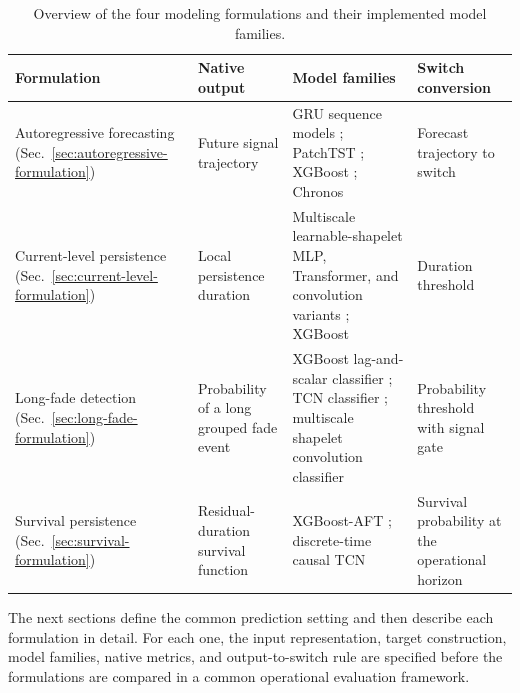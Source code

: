 \begin{table}[htbp]
  \centering
  \small
  \caption{Overview of the four modeling formulations and their implemented
  model families.}
  \label{tab:modeling-formulation-matrix}
  \vspace{0.45em}
  \renewcommand{\arraystretch}{1.35}
  \setlength{\tabcolsep}{5pt}
  \begin{tabular}{@{}>{\raggedright\arraybackslash}p{}
    >{\raggedright\arraybackslash}p{}
    >{\raggedright\arraybackslash}p{}
    >{\raggedright\arraybackslash}p{}@{}}
    \toprule
    Formulation & Native output & Model families & Switch conversion \\
    \midrule
    Autoregressive forecasting (Sec.~\ref{sec:autoregressive-formulation})
      & Future signal trajectory
      & GRU sequence models \cite{cho2014learning,chung2014empirical};
        PatchTST \cite{nie2023patchtst}; XGBoost \cite{chen2016xgboost};
        Chronos \cite{ansari2024chronos}
      & Forecast trajectory to switch \\
    Current-level persistence (Sec.~\ref{sec:current-level-formulation})
      & Local persistence duration
      & Multiscale learnable-shapelet MLP, Transformer, and convolution
        variants \cite{grabocka2014learning}; XGBoost \cite{chen2016xgboost}
      & Duration threshold \\
    Long-fade detection (Sec.~\ref{sec:long-fade-formulation})
      & Probability of a long grouped fade event
      & XGBoost lag-and-scalar classifier \cite{chen2016xgboost}; TCN
        classifier \cite{bai2018tcn}; multiscale shapelet convolution
        classifier \cite{grabocka2014learning}
      & Probability threshold with signal gate \\
    Survival persistence (Sec.~\ref{sec:survival-formulation})
      & Residual-duration survival function
      & XGBoost-AFT \cite{barnwal2022xgboostAft}; discrete-time causal TCN
        \cite{gensheimer2019nnet,bai2018tcn}
      & Survival probability at the operational horizon \\
    \bottomrule
  \end{tabular}
\end{table}

The next sections define the common prediction setting and then describe each
formulation in detail. For each one, the input representation, target
construction, model families, native metrics, and output-to-switch rule are
specified before the formulations are compared in a common operational
evaluation framework.


